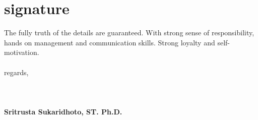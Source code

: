 \documentclass[style=verbose,maxnames=99,sorting=ydnt,backend=biber]{friggeri-cv} %
\begin{document}


\section{signature}

The fully truth of the details are guaranteed. 
With strong sense of responsibility, hands on management and communication skills. 
Strong loyalty and self-motivation. 
\\
\\ 
regards, 
\\ 
\\
\\
\\
\textbf{Sritrusta Sukaridhoto, ST. Ph.D.} 
\end{document}
